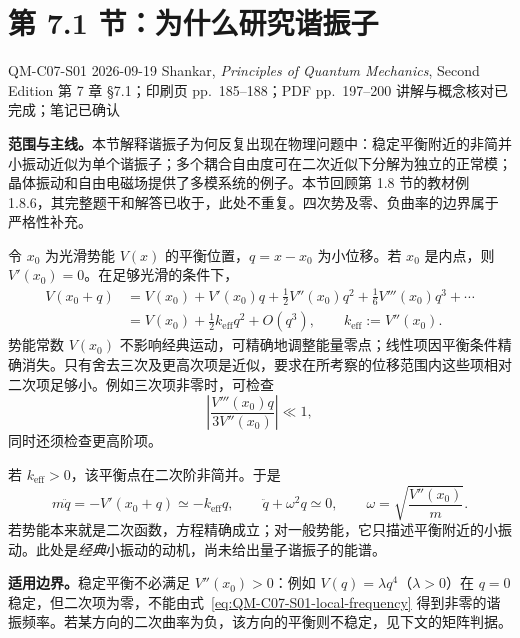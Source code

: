 \section{第 7.1 节：为什么研究谐振子}
\label{section:QM-C07-S01}

\studymeta
  {QM-C07-S01}
  {2026-09-19}
  {Shankar, \textit{Principles of Quantum Mechanics}, Second Edition}
  {第 7 章 \S 7.1；印刷页 pp.~185--188；PDF pp.~197--200}
  {讲解与概念核对已完成；笔记已确认}

\textbf{范围与主线。}本节解释谐振子为何反复出现在物理问题中：稳定平衡附近的非简并小振动近似为单个谐振子；多个耦合自由度可在二次近似下分解为独立的正常模；晶体振动和自由电磁场提供了多模系统的例子。本节回顾第 1.8 节的教材例 1.8.6，其完整题干和解答已收于，此处不重复。四次势及零、负曲率的边界属于严格性补充。



令 $x_0$ 为光滑势能 $V(x)$ 的平衡位置，$q=x-x_0$ 为小位移。若 $x_0$ 是内点，则 $V'(x_0)=0$。在足够光滑的条件下，
\begin{align}
  V(x_0+q)
  &=V(x_0)+V'(x_0)q+\frac12V''(x_0)q^2
    +\frac16V'''(x_0)q^3+\cdots\\
  &=V(x_0)+\frac12k_{\mathrm{eff}}q^2+O(q^3),
  \qquad k_{\mathrm{eff}}:=V''(x_0).
  \label{eq:QM-C07-S01-taylor}
\end{align}
势能常数 $V(x_0)$ 不影响经典运动，可精确地调整能量零点；线性项因平衡条件精确消失。只有舍去三次及更高次项是近似，要求在所考察的位移范围内这些项相对二次项足够小。例如三次项非零时，可检查
\begin{equation}
  \left|\frac{V'''(x_0)q}{3V''(x_0)}\right|\ll1,
\end{equation}
同时还须检查更高阶项。

若 $k_{\mathrm{eff}}>0$，该平衡点在二次阶非简并。于是
\begin{equation}
  m\ddot q=-V'(x_0+q)\simeq-k_{\mathrm{eff}}q,
  \qquad
  \boxed{\ddot q+\omega^2q\simeq0},
  \qquad
  \boxed{\omega=\sqrt{\frac{V''(x_0)}{m}}}.
  \label{eq:QM-C07-S01-local-frequency}
\end{equation}
若势能本来就是二次函数，方程精确成立；对一般势能，它只描述平衡附近的小振动。此处是\emph{经典}小振动的动机，尚未给出量子谐振子的能谱。

\textbf{适用边界。}稳定平衡不必满足 $V''(x_0)>0$：例如 $V(q)=\lambda q^4$（$\lambda>0$）在 $q=0$ 稳定，但二次项为零，不能由式~\eqref{eq:QM-C07-S01-local-frequency} 得到非零的谐振频率。若某方向的二次曲率为负，该方向的平衡则不稳定，见下文的矩阵判据。


